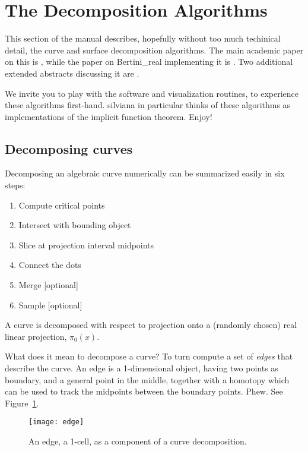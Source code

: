 \section{The Decomposition Algorithms}
\label{sec:algo}

This section of the manual describes, hopefully without too much techinical detail, the curve and surface decomposition algorithms.  The main academic paper on this is \cite{besana2013cell}, while the paper on Bertini\_real implementing it is \cite{BrN15}.  Two additional extended abstracts discussing it are \cite{Brake2014, On14}.

We invite you to play with the software and visualization routines, to experience these algorithms first-hand.  silviana in particular thinks of these algorithms as implementations of the implicit function theorem.  Enjoy!


\subsection{Decomposing curves}
\label{sec:algo_curve}



Decomposing an algebraic curve numerically can be summarized easily in six steps:
%
\begin{enumerate}[noitemsep]
\item Compute critical points
\item Intersect with bounding object
\item Slice at projection interval midpoints
\item Connect the dots
\item Merge [optional]
\item Sample [optional]
\end{enumerate}

A curve is decomposed with respect to projection onto a (randomly chosen) real linear projection, $\pi_0(x)$.


What does it mean to decompose a curve?  To turn compute a set of {\em edges} that describe the curve.  An edge is a 1-dimensional object, having two points as boundary, and a general point in the middle, together with a homotopy which can be used to track the midpoints between the boundary points.  Phew.  See Figure~\ref{fig:edge}.




\begin{figure}[H]
\begin{center}
\texttt{[image: edge]}
\caption{An edge, a 1-cell, as a component of a curve decomposition.}
\label{fig:edge}
\end{center}
\end{figure}


